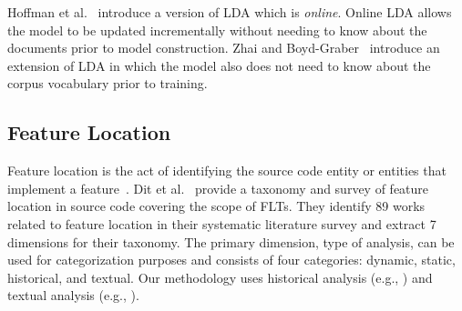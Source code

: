 Hoffman et al.~\cite{Hoffman-etal:2010} introduce a version of LDA which is
\emph{online}.  Online LDA allows the model to be updated incrementally without
needing to know about the documents prior to model construction.  Zhai and
Boyd-Graber~\cite{Zhai-Boyd-Graber:2013} introduce an extension of LDA in which
the model also does not need to know about the corpus vocabulary prior to
training.


\subsection{Feature Location}

Feature location is the act of identifying the source code entity or entities
that implement a feature~\cite{Rajlich-Wilde:2002}.
Dit et al.~\cite{Dit-etal:2011} provide a taxonomy and survey of feature
location in source code covering the scope of FLTs.  They identify 89 works
related to feature location in their systematic literature survey and extract
7 dimensions for their taxonomy.  The primary dimension, type of analysis, can
be used for categorization purposes and consists of four categories: dynamic,
static, historical, and textual.
Our methodology uses historical analysis (e.g., \cite{Cubranic-etal:2005}) and textual analysis (e.g., \cite{Marcus-etal:2004}).

